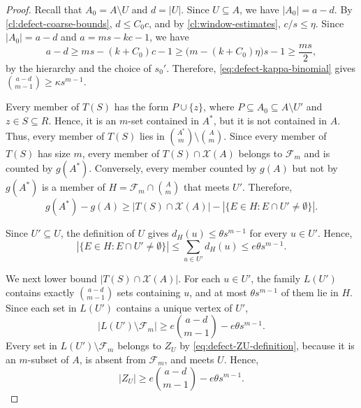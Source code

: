 \documentclass[10pt,a4paper]{article}
\numberwithin{equation}{section}
\theoremstyle{definition}
\newcommand{\F}{\mathcal F}
\newcommand{\X}{\mathcal X}
\begin{document}
\begin{proof}
        Recall that $A_0=A\setminus U$ and $d=|U|$.
        Since $U\subseteq A$, we have $|A_0|=a-d$.
        By \cref{cl:defect-coarse-bounds}, $d\le C_0c$, and by
        \cref{cl:window-estimates}, $c/s\le\eta$.
        Since $|A_0|=a-d$ and $a=ms-kc-1$, we have
        \[
                a-d
                \ge ms-(k+C_0)c-1
                \ge\bigl(m-(k+C_0)\eta\bigr)s-1
                \ge\frac{ms}{2},
        \]
        by the hierarchy and the choice of $s_0'$.
        Therefore, \eqref{eq:defect-kappa-binomial} gives
        $\binom{a-d}{m-1}\ge \kappa s^{m-1}$.

        Every member of $T(S)$ has the form $P\cup\{z\}$, where
        $P\subseteq A_0\subseteq A\setminus U'$ and $z\in S\subseteq R$.
        Hence, it is an $m$-set contained in $A^*$, but it is not
        contained in $A$. Thus, every member of $T(S)$ lies in
        $\binom{A^*}m\setminus\binom Am$.
        Since every member of $T(S)$ has size $m$, every member of
        $T(S)\cap\X(A)$ belongs to $\F_m$ and is counted by $g(A^*)$.
        Conversely, every member counted by $g(A)$ but not by $g(A^*)$
        is a member of $H=\F_m\cap\binom Am$ that meets $U'$.
        Therefore,
        \begin{equation}\label{eq:g-switch-basic-gain-loss}
                g(A^*)-g(A)
                \ge
                |T(S)\cap\X(A)|
                -|\{E\in H:E\cap U'\ne\emptyset\}|.
        \end{equation}

        Since $U'\subseteq U$, the definition of $U$ gives
        $d_H(u)\le \theta s^{m-1}$ for every $u\in U'$. Hence,
        \begin{equation}\label{eq:g-switch-lost-H-bound}
                |\{E\in H:E\cap U'\ne\emptyset\}|
                \le
                \sum_{u\in U'}d_H(u)
                \le e\theta s^{m-1}.
        \end{equation}

        We next lower bound $|T(S)\cap\X(A)|$.
        For each $u\in U'$, the family $L(U')$ contains exactly
        $\binom{a-d}{m-1}$ sets containing $u$, and at most
        $\theta s^{m-1}$ of them lie in $H$.
        Since each set in $L(U')$ contains a unique vertex of $U'$,
        \[
                |L(U')\setminus\F_m|
                \ge
                e\binom{a-d}{m-1}-e\theta s^{m-1}.
        \]
        Every set in $L(U')\setminus\F_m$ belongs to $Z_U$ by
        \eqref{eq:defect-ZU-definition}, because it is an $m$-subset of
        $A$, is absent from $\F_m$, and meets $U$. Hence,
        \begin{equation}\label{eq:g-switch-ZU-lower}
                |Z_U|
                \ge
                e\binom{a-d}{m-1}-e\theta s^{m-1}.
        \end{equation}


\end{proof}
\end{document}
